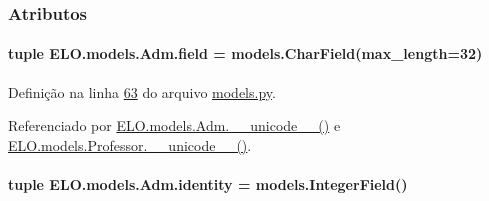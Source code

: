 

\subsubsection{Atributos}
\hypertarget{classELO_1_1models_1_1Adm_ae1af4ca22491b1cfe9cb0a7acefaa71e}{
\paragraph[{field}]{\setlength{\rightskip}{0pt plus 5cm}tuple E\-L\-O.\-models.\-Adm.\-field = models.\-Char\-Field(max\-\_\-length=32)\hspace{0.3cm}{\ttfamily [static]}}}\label{classELO_1_1models_1_1Adm_ae1af4ca22491b1cfe9cb0a7acefaa71e}


Definição na linha \hyperlink{ELO_2models_8py_source_l00063}{63} do arquivo \hyperlink{ELO_2models_8py_source}{models.\-py}.



Referenciado por \hyperlink{classELO_1_1models_1_1Adm_a3541c3ae12b8d2da3f44ac6be00a23e6}{E\-L\-O.\-models.\-Adm.\-\_\-\-\_\-unicode\-\_\-\-\_\-()} e \hyperlink{classELO_1_1models_1_1Professor_aefc9d63d429e19ec3487a7879879f29d}{E\-L\-O.\-models.\-Professor.\-\_\-\-\_\-unicode\-\_\-\-\_\-()}.

\hypertarget{classELO_1_1models_1_1Adm_af7e7b797ce5d3396e8a54d8927450d75}{
\paragraph[{identity}]{\setlength{\rightskip}{0pt plus 5cm}tuple E\-L\-O.\-models.\-Adm.\-identity = models.\-Integer\-Field()\hspace{0.3cm}{\ttfamily [static]}}}\label{classELO_1_1models_1_1Adm_af7e7b797ce5d3396e8a54d8927450d75}


